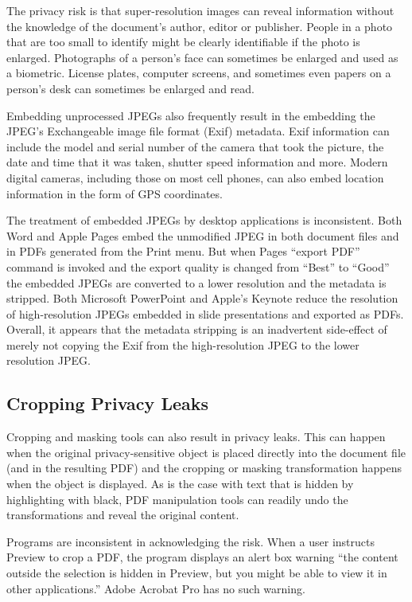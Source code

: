 \documentclass{article}
\begin{document}
The privacy risk is that super-resolution images can reveal information
without the knowledge of the document's author, editor or
publisher. People in a photo that are too small to identify might be
clearly identifiable if the photo is enlarged. Photographs of a
person's face can sometimes be enlarged and used as a
biometric. License plates, computer screens, and sometimes even papers
on a person's desk can sometimes be enlarged and read. 

Embedding unprocessed JPEGs also frequently result in the
embedding the JPEG's Exchangeable image file format (Exif) metadata. Exif
information can include the model and serial number of the camera that
took the picture, the date and time that it was taken, shutter speed
information and more. Modern digital cameras, including those on most
cell phones, can also embed location information in the form of GPS
coordinates.

The treatment of embedded JPEGs by desktop applications is
inconsistent. Both Word and Apple Pages embed the
unmodified JPEG in both document files and in PDFs generated from the Print
menu. But when Pages ``export PDF'' command is invoked and the export
quality is changed from ``Best'' to ``Good'' the embedded
JPEGs are converted to a lower resolution and the metadata is stripped.
Both Microsoft PowerPoint and Apple's Keynote reduce the resolution of
high-resolution JPEGs embedded in slide presentations and exported as
PDFs. Overall,  it appears that the metadata stripping is an
inadvertent side-effect of
merely not copying the Exif from the high-resolution JPEG to the lower
resolution JPEG.


\subsection{Cropping Privacy Leaks}

Cropping and masking tools can also result in
privacy leaks. This can happen when the original privacy-sensitive
object is placed directly into the document file (and in the resulting
PDF) and the cropping or masking transformation happens when the
object is displayed. As is the case with text that is hidden by
highlighting with black, PDF manipulation tools can readily undo the
transformations and reveal the original content.

Programs are inconsistent in acknowledging the risk. When a user instructs Preview to crop a PDF, the program
displays an alert box warning ``the content outside the selection is
hidden in Preview, but you might be able to view it in other
applications.'' Adobe Acrobat Pro has no such warning.
\end{document}
